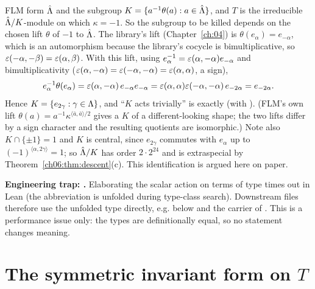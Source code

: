 \begin{remark}[Why $K=\{e_{2\alpha}\}$ is the right normalisation]\label{ch06:rem:K}
FLM form $\hat{{\Lambda}}$ and the subgroup $K=\{a^{-1}\theta(a): a\in\hat{{\Lambda}}\}$, and $T$ is the
irreducible $\hat{{\Lambda}}/K$-module on which $\kappa=-1$.  So the subgroup to be killed depends on
the chosen lift $\theta$ of $-1$ to $\hat{{\Lambda}}$.  The library's lift (Chapter~\ref{ch:04}) is
$\theta(e_\alpha)=e_{-\alpha}$, which is an automorphism because the library's cocycle is
bimultiplicative, so $\varepsilon(-\alpha,-\beta)=\varepsilon(\alpha,\beta)$.  With this lift,
using $e_\alpha^{-1}=\varepsilon(\alpha,-\alpha)e_{-\alpha}$ and bimultiplicativity
($\varepsilon(\alpha,-\alpha)=\varepsilon(-\alpha,-\alpha)=\varepsilon(\alpha,\alpha)$, a sign),
\begin{equation*}
  e_\alpha^{-1}\theta(e_\alpha)=\varepsilon(\alpha,-\alpha)\,e_{-\alpha}e_{-\alpha}
  =\varepsilon(\alpha,\alpha)\varepsilon(-\alpha,-\alpha)\,e_{-2\alpha}=e_{-2\alpha}.
\end{equation*}
Hence $K=\{e_{2\gamma}:\gamma\in{\Lambda}\}$, and ``$K$ acts trivially'' is exactly
 (with ).  (FLM's own lift
$\theta(a)=a^{-1}\kappa^{\langle\bar a,\bar a\rangle/2}$ gives a $K$ of a different-looking shape;
the two lifts differ by a sign character and the resulting quotients are isomorphic.)  Note
also $K\cap\{\pm1\}=1$ and $K$ is central, since $e_{2\gamma}$ commutes with $e_\alpha$ up to
$(-1)^{\langle\alpha,2\gamma\rangle}=1$; so $\hat{{\Lambda}}/K$ has order $2\cdot2^{24}$ and is
extraspecial by Theorem~\ref{ch06:thm:descent}(c).  This identification is argued here on paper.
\end{remark}

\begin{warning}
\textbf{Engineering trap: .}  Elaborating the scalar action on terms of type
 times out in Lean (the abbreviation is unfolded during type-class
search).  Downstream files therefore use the unfolded type  directly, e.g.
 below and the carrier of .  This is a performance
issue only: the types are definitionally equal, so no statement changes meaning.
\end{warning}

\section{The symmetric invariant form on \texorpdfstring{$T$}{T}}\label{ch06:sec:form}

